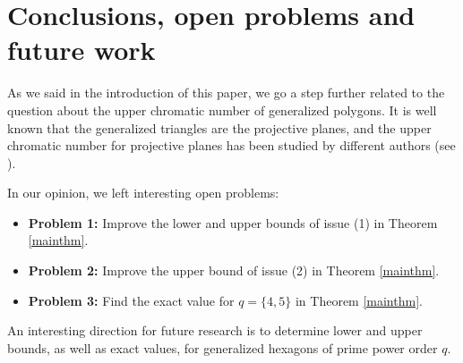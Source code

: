 \documentclass[12pt]{article}
\begin{document}
\section{Conclusions, open problems and future work} \label{sec.conclandfuture}

As we said in the introduction of this paper, we go a step further related to the question about the upper chromatic number of generalized polygons. It is well known that the generalized triangles \cite{KS20} are the projective planes, and the upper chromatic number for projective planes has been studied by different authors (see \cite{daisyPP,bhs, bt}).

In our opinion, we left interesting open problems: 
\begin{itemize}
\item{\bf{Problem 1:}} Improve the lower and upper bounds of issue (1) in Theorem \ref{mainthm}.
\item{\bf{Problem 2:}} Improve the upper bound of issue (2) in Theorem \ref{mainthm}.
\item{\bf{Problem 3:}} Find the exact value for $q=\{4,5\}$ in Theorem \ref{mainthm}.
\end{itemize}

An interesting direction for future research is to determine lower and upper bounds, as well as exact values, for generalized hexagons of prime power order $q$.

\end{document}
